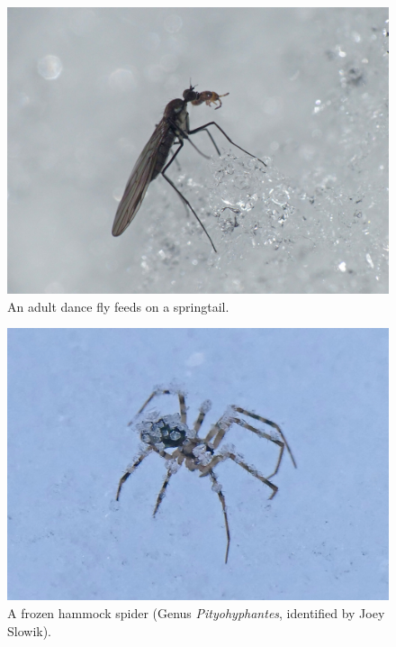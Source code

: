\begin{multicols}{2}



\begin{figure}[H]
\begin{center}
\vspace{2mm}
\includegraphics[width=\textwidth]{img/dance_fly.jpg}
\caption{An adult dance fly feeds on a springtail.}
\label{dance_fly}
\end{center}
\end{figure}

\begin{figure}[H]
\begin{center}
\vspace{21mm}
\includegraphics[width=\textwidth]{img/Pityohyphantes.jpg}
\caption{A frozen hammock spider (Genus \textit{Pityohyphantes}, identified by Joey Slowik).}
\label{Pityohyphantes}
\end{center}
\end{figure}




\end{multicols}
